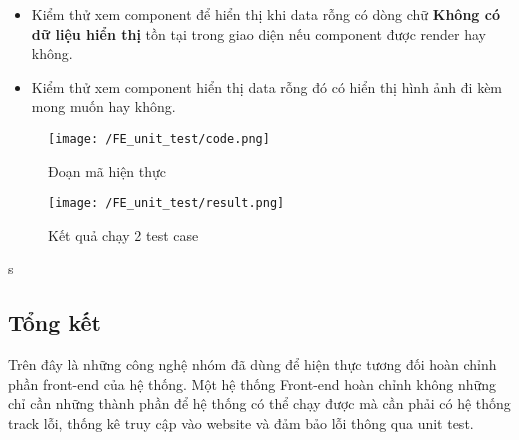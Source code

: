 			 	\begin{itemize}
			 		\item Kiểm thử xem component để hiển thị khi data rỗng có dòng chữ \textbf{Không có dữ liệu hiển thị} tồn tại trong giao diện nếu component được render hay không.
			 		\item Kiểm thử xem component hiển thị data rỗng đó có hiển thị hình ảnh đi kèm mong muốn hay không.
			 	\end{itemize}
			 	
			 	\begin{figure}[H]
			 		\texttt{[image: /FE\_unit\_test/code.png]}
			 		\centering
			 		\caption{Đoạn mã hiện thực}
			 	\end{figure}
			 	
			 	\begin{figure}[H]
			 		\texttt{[image: /FE\_unit\_test/result.png]}
			 		\centering
			 		\caption{Kết quả chạy 2 test case}
			 	\end{figure}s
			 	
			 	\subsection{Tổng kết}
			 	Trên đây là những công nghệ nhóm đã dùng để hiện thực tương đối hoàn chỉnh phần front-end của hệ thống. Một hệ thống Front-end hoàn chỉnh không những chỉ cần những thành phần để hệ thống có thể chạy được mà cần phải có hệ thống track lỗi, thống kê truy cập vào website và đảm bảo lỗi thông qua unit test.
		
	